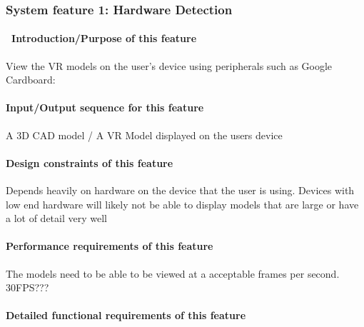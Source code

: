 \documentclass[letterpaper, 10pt, draftclsnofoot, onecolumn]{IEEEtran}
\begin{document}
{%

\subsubsection[{Updated Vrok-it}]{\rmfamily\bfseries\color{black} System
feature 1: Hardware Detection}
\paragraph[\ Introduction/Purpose of this
feature]{\foreignlanguage{english}{\ }\foreignlanguage{english}{Introduction/Purpose
of this feature}}
{\color{black}
View the VR models on the user's device using peripherals such as Google Cardboard:   }

\paragraph[Input/Output sequence for this
feature]{\rmfamily\bfseries\color{black}
Input/Output sequence for this feature}
{\color{black}
A 3D CAD model / A VR Model displayed on the users device  }

\paragraph[Design constraints of this
feature]{\rmfamily\bfseries\color{black} Design
constraints of this feature}
{\color{black}
Depends heavily on hardware on the device that the user is using. Devices with low end hardware will likely not be able to display models that are large or have a lot of detail very well  }

\paragraph[Performance requirements of this
feature]{\rmfamily\bfseries\color{black}
Performance requirements of this feature}
{\color{black}
The models need to be able to be viewed at a acceptable frames per second. 30FPS???  }

\paragraph[Detailed functional requirements of this
feature]{\rmfamily\bfseries\color{black}
Detailed functional requirements of this feature}


}
\end{document}
